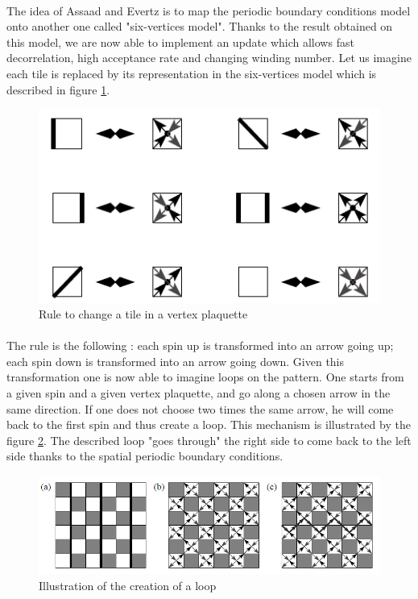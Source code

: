 \documentclass[a4paper,12pt,twoside]{article}
\begin{document}
	\paragraph{}The idea of Assaad and Evertz is to map the periodic boundary conditions model onto another one called "six-vertices model". Thanks to the result obtained on this model, we are now able to implement an update which allows fast decorrelation, high acceptance rate and changing winding number.
	Let us imagine each tile is replaced by its representation in the six-vertices model which is described in figure \ref{six_vertex}.
	\begin{figure}[!h]
		\centering
		\includegraphics[]{six_vertex.png}
		\caption{Rule to change a tile in a vertex plaquette}
		\label{six_vertex}
	\end{figure}

	\paragraph{} The rule is the following : each spin up is transformed into an arrow going up; each spin down is transformed into an arrow going down. 
	Given this transformation one is now able to imagine loops on the pattern. One starts from a given spin and a given vertex plaquette, and go along a chosen arrow in the same direction. If one does not choose two times the same arrow, he will come back to the first spin and thus create a loop. This mechanism is illustrated by the figure \ref{creating_loop}. The described loop "goes through" the right side to come back to the left side thanks to the spatial periodic boundary conditions.
	\begin{figure}[!h]
		\centering
		\includegraphics[]{creating_loop.png}
		\caption{Illustration of the creation of a loop}
		\label{creating_loop}
	\end{figure}
\end{document}
